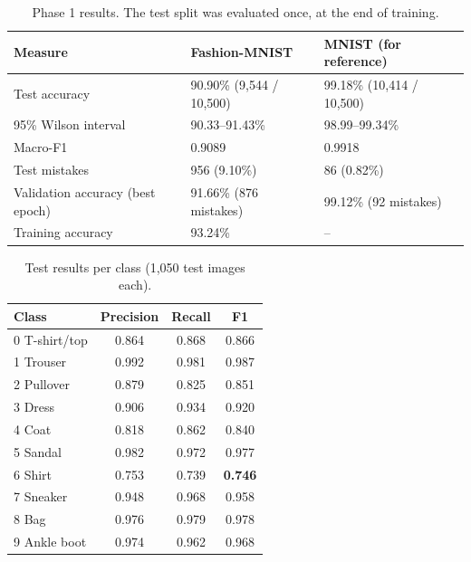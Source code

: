 \documentclass[11pt]{article}
\begin{document}
\begin{table}[H]
\centering
\renewcommand{\arraystretch}{1.10}
\begin{tabular}{|p{}|p{}|p{}|}
\hline
\textbf{Measure} & \textbf{Fashion-MNIST} & \textbf{MNIST (for reference)} \\ \hline
Test accuracy & 90.90\% (9,544 / 10,500) & 99.18\% (10,414 / 10,500) \\ \hline
95\% Wilson interval & 90.33--91.43\% & 98.99--99.34\% \\ \hline
Macro-F1 & 0.9089 & 0.9918 \\ \hline
Test mistakes & 956 (9.10\%) & 86 (0.82\%) \\ \hline
Validation accuracy (best epoch) & 91.66\% (876 mistakes) & 99.12\% (92 mistakes) \\ \hline
Training accuracy & 93.24\% & -- \\ \hline
\end{tabular}
\caption{Phase 1 results. The test split was evaluated once, at the end of training.}
\label{tab:results}
\end{table}

\begin{table}[H]
\centering
\renewcommand{\arraystretch}{1.08}
\small
\begin{tabular}{|l|c|c|c|}
\hline
\textbf{Class} & \textbf{Precision} & \textbf{Recall} & \textbf{F1} \\ \hline
0 T-shirt/top & 0.864 & 0.868 & 0.866 \\ \hline
1 Trouser & 0.992 & 0.981 & 0.987 \\ \hline
2 Pullover & 0.879 & 0.825 & 0.851 \\ \hline
3 Dress & 0.906 & 0.934 & 0.920 \\ \hline
4 Coat & 0.818 & 0.862 & 0.840 \\ \hline
5 Sandal & 0.982 & 0.972 & 0.977 \\ \hline
6 Shirt & 0.753 & 0.739 & \textbf{0.746} \\ \hline
7 Sneaker & 0.948 & 0.968 & 0.958 \\ \hline
8 Bag & 0.976 & 0.979 & 0.978 \\ \hline
9 Ankle boot & 0.974 & 0.962 & 0.968 \\ \hline
\end{tabular}
\caption{Test results per class (1,050 test images each).}
\label{tab:perclass}
\end{table}
\end{document}
